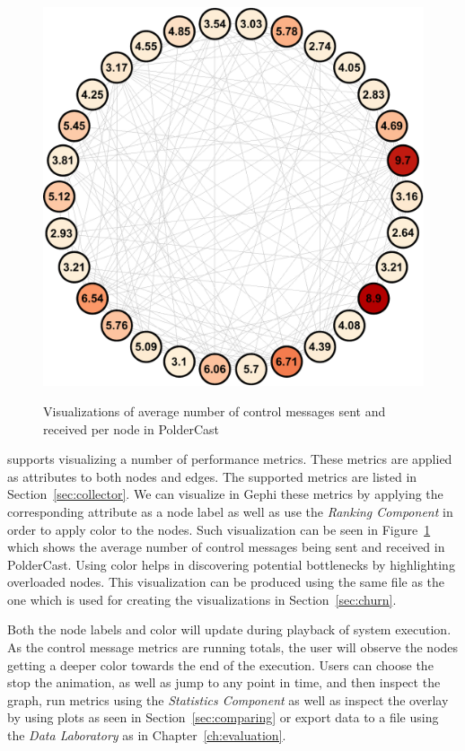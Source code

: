 \begin{figure}[Ht]
{    \includegraphics[scale=0.35]{figures/msg_rcv_avg}
}
\caption{Visualizations of average number of control messages sent and
    received per node in PolderCast}
\label{fig:avg_ctrl}
\end{figure}


\demo{} supports visualizing a number of performance metrics. These
metrics are applied as attributes to both nodes and edges. The supported
metrics are listed in Section~\ref{sec:collector}. We can visualize in
Gephi these metrics by applying the corresponding attribute as a node
label as well as use the \emph{Ranking Component} in order to apply
color to the nodes. Such visualization can be seen in
Figure~\ref{fig:avg_ctrl} which shows the average number of control
messages being sent and received in PolderCast. Using color helps in
discovering potential bottlenecks by highlighting overloaded nodes. This
visualization can be produced using the same \gexf{} file as the one
which is used for creating the visualizations in
Section~\ref{sec:churn}.

Both the node labels and color will update during playback of system
execution. As the control message metrics are running totals, the user
will observe the nodes getting a deeper color towards the end of the
execution. Users can choose the stop the animation, as well as jump to
any point in time, and then inspect the graph, run metrics using the
\emph{Statistics Component} as well as inspect the overlay by using
plots as seen in Section~\ref{sec:comparing} or export data to a \csv
file using the \emph{Data Laboratory} as in Chapter~\ref{ch:evaluation}.

